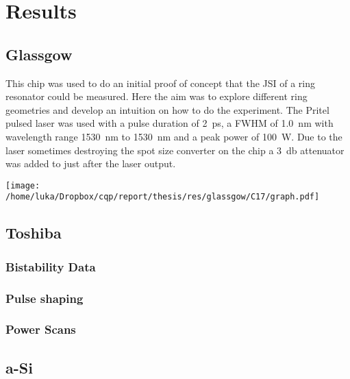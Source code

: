 \newpage
\section{Results}
\subsection{Glassgow}



This chip was used to do an initial proof of concept that the JSI of a ring resonator could be measured. Here the aim was to explore different ring geometries and develop an intuition on how to do the experiment. The Pritel pulsed laser was used with a pulse duration of \SI{2}{\pico\second}, a FWHM of \SI{1.0}{\nano\meter} with wavelength range \SI{1530}{\nano\meter} to \SI{1530}{\nano\meter} and a peak power of \SI{100}{\watt}. Due to the laser sometimes destroying the spot size converter on the chip a \SI{3}{\decibel} attenuator was added to just after the laser output.

\begingroup
    \centering  
    \texttt{[image: /home/luka/Dropbox/cqp/report/thesis/res/glassgow/C17/graph.pdf]}
     \vspace{3pt} \label{crossCompare}
\endgroup

\subsection{Toshiba}


\subsubsection{Bistability Data}
\subsubsection{Pulse shaping}
\subsubsection{Power Scans}
%
\subsection{a-Si}

